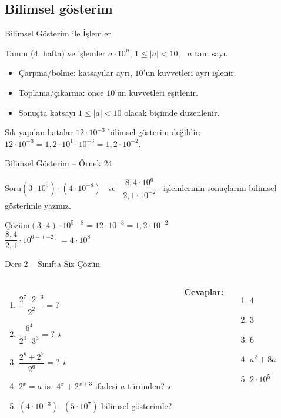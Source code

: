 \documentclass[aspectratio=169,11pt]{beamer}
\newcommand{\soru}[3]{%
\begin{frame}{#1}
  \begin{block}{Soru}\large #2\end{block}
  \pause
  \begin{exampleblock}{Çözüm}\large #3\end{exampleblock}
\end{frame}}
\begin{document}
\subsection{Bilimsel gösterim}
\begin{frame}{Bilimsel Gösterim ile İşlemler}
\begin{block}{Tanım (4. hafta) ve işlemler}
\(a\cdot 10^n\), \quad \(1\le |a|<10\), \ \(n\) tam sayı.
\begin{itemize}
\item Çarpma/bölme: katsayılar ayrı, \(10\)'un kuvvetleri ayrı işlenir.
\item Toplama/çıkarma: önce \(10\)'un kuvvetleri eşitlenir.
\item Sonuçta katsayı \(1\le |a|<10\) olacak biçimde düzenlenir.
\end{itemize}
\end{block}
\begin{alertblock}{Sık yapılan hatalar}
\(12\cdot 10^{-3}\) bilimsel gösterim değildir: \ \(12\cdot 10^{-3}=1{,}2\cdot 10^{1}\cdot 10^{-3}=1{,}2\cdot 10^{-2}\).
\end{alertblock}
\end{frame}

\soru{Bilimsel Gösterim -- Örnek 24}
{\((3\cdot 10^5)\cdot(4\cdot 10^{-8})\) \ ve \ \(\dfrac{8{,}4\cdot 10^{6}}{2{,}1\cdot 10^{-2}}\) \ işlemlerinin sonuçlarını bilimsel gösterimle yazınız.}
{\((3\cdot 4)\cdot 10^{5-8}=12\cdot 10^{-3}=1{,}2\cdot 10^{-2}\)\\[4pt]
\(\dfrac{8{,}4}{2{,}1}\cdot 10^{6-(-2)}=4\cdot 10^{8}\)}

\begin{frame}{Ders 2 -- Sınıfta Siz Çözün}
\begin{columns}[t]
\begin{enumerate}
\item \(\dfrac{2^7\cdot 2^{-3}}{2^2}=?\)
\item \(\dfrac{6^4}{2^4\cdot 3^3}=?\) \(\star\)
\item \(\dfrac{2^8+2^7}{2^6}=?\) \(\star\)
\item \(2^x=a\) ise \(4^x+2^{x+3}\) ifadesi \(a\) türünden? \(\star\)
\item \((4\cdot 10^{-3})\cdot(5\cdot 10^{7})\) bilimsel gösterimle?
\end{enumerate}
\pause
\textbf{Cevaplar:}
\begin{enumerate}
\item \(4\)
\item \(3\)
\item \(6\)
\item \(a^2+8a\)
\item \(2\cdot 10^{5}\)
\end{enumerate}
\end{columns}
\vspace{4pt}{\footnotesize \(\star\) işaretli soruların adım adım çözümü sonraki slaytlardadır.}
\end{frame}
\end{document}

